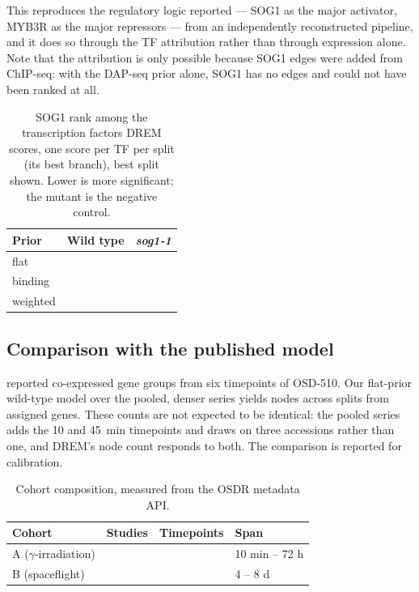 This reproduces the regulatory logic \citet{bourbousse2018sog1} reported --- SOG1 as the
major activator, MYB3R as the major repressors --- from an independently reconstructed
pipeline, and it does so through the TF attribution rather than through expression alone.
Note that the attribution is only possible because SOG1 edges were added from ChIP-seq:
with the DAP-seq prior alone, SOG1 has no edges and could not have been ranked at all.

\begin{table}[t]
\centering
\caption{SOG1 rank among the \NumTFsRanked{} transcription factors DREM scores, one
score per TF per split (its best branch), best split shown. Lower is more significant; the
mutant is the negative control.}
\label{tab:genotype}
\begin{tabular}{lrr}
\toprule
Prior & Wild type & \textit{sog1-1} \\
\midrule
flat     & \SogOneTfRankWTFlat{}     & \SogOneTfRankMutFlat{} \\
binding  & \SogOneTfRankWTBinding{}  & \SogOneTfRankMutBinding{} \\
weighted & \SogOneTfRankWTWeighted{} & \SogOneTfRankMutWeighted{} \\
\bottomrule
\end{tabular}
\end{table}

\subsection{Comparison with the published model}

\citet{bourbousse2018sog1} reported \NumPublishedGroups{} co-expressed gene groups from
six timepoints of OSD-510. Our flat-prior wild-type model over the pooled, denser series
yields \NumWTNodes{} nodes across \NumWTSplits{} splits from
\NumWTGenesAssigned{} assigned genes. These counts are not expected to be identical: the
pooled series adds the 10 and 45~min timepoints and draws on three accessions rather than
one, and DREM's node count responds to both. The comparison is reported for calibration.

\begin{table}[t]
\centering
\caption{Cohort composition, measured from the OSDR metadata API.}
\label{tab:cohorts}
\begin{tabular}{llrl}
\toprule
Cohort & Studies & Timepoints & Span \\
\midrule
A ($\gamma$-irradiation) & \NumCohortAStudies{} & \NumCohortATimepoints{} & 10 min -- 72 h \\
B (spaceflight)          & \NumCohortBStudies{} & \NumCohortBTimepoints{} & 4 -- 8 d \\
\bottomrule
\end{tabular}
\end{table}
